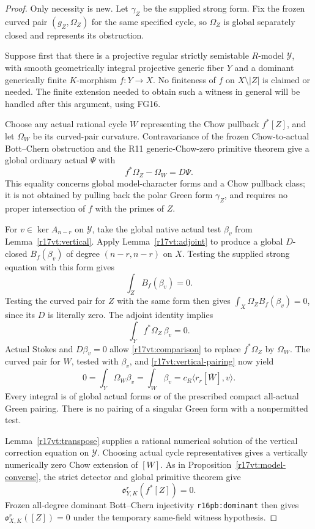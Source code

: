 \begin{proof}
Only necessity is new. Let $\gamma_Z$ be the supplied strong
form. Fix the frozen curved pair $(g_Z,\Omega_Z)$ for the
same specified cycle, so $\Omega_Z$ is global separately
closed and represents its obstruction.

Suppose first that there is a projective regular strictly
semistable $R$-model $\mathcal Y$, with smooth geometrically
integral projective generic fiber $Y$ and a dominant
generically finite $K$-morphism $f:Y\to X$. No finiteness
of $f$ on $X\setminus|Z|$ is claimed or needed. The finite
extension needed to obtain such a witness in general will
be handled after this argument, using FG16.

Choose any actual rational cycle $W$ representing the
Chow pullback $f^*[Z]$, and let $\Omega_W$ be its curved-pair
curvature. Contravariance of the frozen Chow-to-actual
Bott--Chern obstruction and the R11 generic-Chow-zero
primitive theorem give a global ordinary actual $\Psi$ with
\[
                  f^*\Omega_Z-\Omega_W=D\Psi.
                  \tag{VT17.6}\label{r17vt:comparison}
\]
This equality concerns global model-character forms and a
Chow pullback class; it is not obtained by pulling back the
polar Green form $\gamma_Z$, and requires no proper
intersection of $f$ with the primes of $Z$.

For $v\in\ker A_{n-r}$ on $\mathcal Y$, take the global
native actual test $\beta_v$ from Lemma~\ref{r17vt:vertical}.
Apply Lemma~\ref{r17vt:adjoint} to produce a global
$D$-closed $B_f(\beta_v)$ of degree $(n-r,n-r)$ on $X$.
Testing the supplied strong equation with this form gives
\[
                         \int_Z B_f(\beta_v)=0.
\]
Testing the curved pair for $Z$ with the same form then
gives $\int_X\Omega_Z B_f(\beta_v)=0$, since its
$D$ is literally zero. The adjoint identity implies
\[
                         \int_Y f^*\Omega_Z\,\beta_v=0.
\]
Actual Stokes and $D\beta_v=0$ allow
\eqref{r17vt:comparison} to replace $f^*\Omega_Z$ by
$\Omega_W$. The curved pair for $W$, tested with
$\beta_v$, and \eqref{r17vt:vertical-pairing} now yield
\[
 0=\int_Y\Omega_W\beta_v
    =\int_W\beta_v
    =c_R\langle r_r[\overline W],v\rangle.
 \tag{VT17.7}\label{r17vt:upstairs-annihilation}
\]
Every integral is of global actual forms or of the
prescribed compact all-actual Green pairing. There is no
pairing of a singular Green form with a nonpermitted test.

Lemma~\ref{r17vt:transpose} supplies a rational numerical
solution of the vertical correction equation on
$\mathcal Y$. Choosing actual cycle representatives gives
a vertically numerically zero Chow extension of $[W]$.
As in Proposition~\ref{r17vt:model-converse}, the strict
detector and global primitive theorem give
\[
                    \mathfrak o_{Y,K}^r(f^*[Z])=0.
\]
Frozen all-degree dominant Bott--Chern injectivity
\texttt{r16pb:dominant} then gives
$\mathfrak o_{X,K}^r([Z])=0$ under the temporary
same-field witness hypothesis.


\end{proof}

